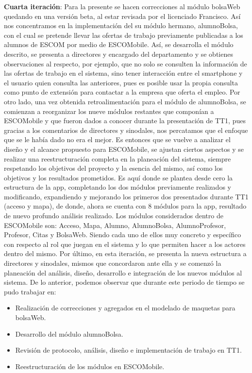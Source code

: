 \noindent
\newline
\textbf{Cuarta iteración}: Para la presente se hacen correcciones al módulo bolsaWeb quedando en una versión beta, al estar revisada por el licenciado Francisco. Así nos concentramos en la implementación del su módulo hermano, alumnoBolsa, con el cual se pretende llevar las ofertas de trabajo previamente publicadas a los alumnos de ESCOM por medio de ESCOMobile. Así, se desarrolla el módulo descrito, se presenta a directores y encargado del departamento y se obtienes observaciones al respecto, por ejemplo, que no solo se consulten la información de las ofertas de trabajo en el sistema, sino tener interacción entre el smartphone y el usuario quien consulta las anteriores, pues es posible usar la propia consulta como punto de extensión para contactar a la empresa que oferta el empleo. 
\newline
\newline
Por otro lado, una vez obtenida retroalimentación para el módulo de alumnoBolsa, se comienzan a reorganizar los nueve módulos restantes que componían a ESCOMobile y que fueron dados a conocer durante la presentación de TT1, pues gracias a los comentarios de directores y sinodales, nos percatamos que el enfoque que se le había dado no era el mejor. Es entonces que se vuelve a analizar el diseño y el alcance propuesto para ESCOMobile, se ajustan ciertos aspectos y se realizar una reestructuración completa en la planeación del sistema, siempre respetando los objetivos del proyecto y la esencia del mismo, así como los objetivos y los resultados prometidos.
\newline
Es aquí donde se plantea desde cero la estructura de la app, completando los dos módulos previamente realizados y modificando, expandiendo y mejorando los primeros dos presentados durante TT1 (acceso y mapa), de donde, ahora se cuenta con 8 módulos para la app, resultado de nuevo profundo análisis realizado. Los módulos considerados dentro de ESCOMobile son: Acceso, Mapa, Alumno, AlumnoBolsa, AlumnoProfesor, Profesor, Citas y BolsaWeb. Siendo cada uno de ellos muy concreto y específico con respecto al rol que juegan en el sistema y lo que permiten hacer a los actores dentro del mismo. 
\newline
Por último, en esta iteración, se presenta la nueva estructura a directores y sinodales, mismos que concordaron ante ella y se comenzó la planeación del análisis, diseño, desarrollo e integración de los nuevos módulos al sistema.
\newline
De lo anterior, podemos observar que durante este periodo de tiempo se pudo trabajar en:
\begin{itemize}
	\item Realización de correcciones y agregados en el modelado de maquetas para bolsaWeb.
	\item Desarrollo del módulo alumnoBolsa.
	\item Revisión de protocolo, análisis, diseño e implementación de trabajo en TT1.
	\item Reestructuración de los módulos en ESCOMobile.
\end{itemize}

